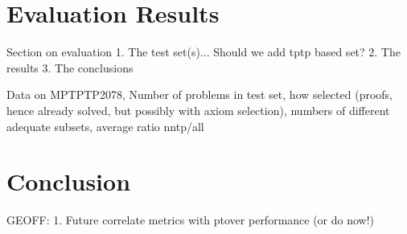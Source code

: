 \documentclass[EPiC]{easychair}
\begin{document}
\section{Evaluation Results}
\label{Results}

Section on evaluation
1. The test set(s)... Should we add tptp based set?
2. The results
3. The conclusions

Data on MPTPTP2078, Number of problems in test set, how selected (proofs,
hence already solved, but possibly with axiom selection), numbers of
different adequate subsets, average ratio nntp/all

\section{Conclusion}
\label{Conclusion}

GEOFF:
1. Future correlate metrics with ptover performance (or do now!)

\label{sect:bib}


\end{document}
